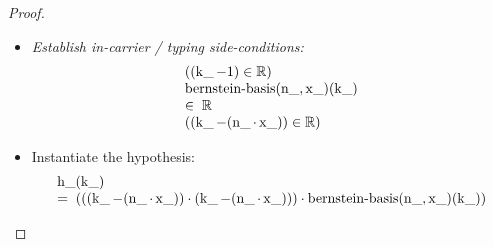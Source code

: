 \documentclass[11pt]{article}
\theoremstyle{plain}
\begin{document}
\begin{proof}
\begin{itemize}[leftmargin=2.8em, itemsep=4pt, parsep=1pt]
  \item[\textbf{83--85}] \emph{Establish in-carrier / typing side-conditions:}
\begin{equation*}
\begin{array}{@{}l@{}}
((\operatorname{k\_} - 1) \in \mathbb{R}) \\
\begin{array}{@{}l@{}} \operatorname{bernstein\text{-}basis}(\operatorname{n\_}, \operatorname{x\_})(\operatorname{k\_}) \\ \in\; \mathbb{R} \end{array} \\
((\operatorname{k\_} - (\operatorname{n\_} \cdot \operatorname{x\_})) \in \mathbb{R})
\end{array}
\end{equation*}

  \item[\textbf{86}] Instantiate the hypothesis:
\begin{equation*}
\begin{array}{@{}l@{}} \operatorname{h\_}(\operatorname{k\_}) \\ =\; (((\operatorname{k\_} - (\operatorname{n\_} \cdot \operatorname{x\_})) \cdot (\operatorname{k\_} - (\operatorname{n\_} \cdot \operatorname{x\_}))) \cdot \operatorname{bernstein\text{-}basis}(\operatorname{n\_}, \operatorname{x\_})(\operatorname{k\_})) \end{array}
\end{equation*}


\end{itemize}
\end{proof}
\end{document}
